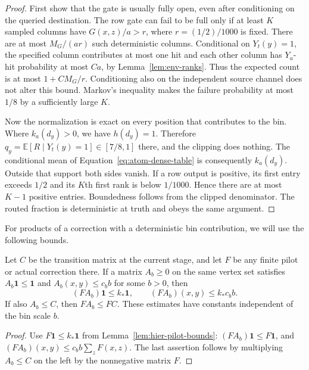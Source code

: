 \begin{proof}
First show that the gate is usually fully open, even after conditioning on the queried destination. The row gate can fail to be full only if at least $K$ sampled columns
have $G(x,z)/a>r$, where $r=(1/2)/1000$ is fixed.
There are at most $M_G/(ar)$ such deterministic columns.
Conditional on $Y_t(y)=1$, the specified column contributes at most one
hit and each other column has $Y_a$-hit probability at most $C a$, by
Lemma~\ref{lem:env-ranks}.  Thus the expected count is at most
$1+CM_G/r$.  Conditioning also on the independent source channel does
not alter this bound.  Markov's inequality makes the failure probability
at most $1/8$ by a sufficiently large $K$.

Now the normalization is exact on every position that contributes to the bin. Where $k_a(d_y)>0$, we have $h(d_y)=1$.  Therefore
$q_y=\mathbb E[R\mid Y_t(y)=1]\in[7/8,1]$ there, and the clipping
does nothing.  The conditional mean of Equation~\eqref{eq:atom-dense-table}
is consequently $k_a(d_y)$.  Outside that support both sides vanish.
If a row output is positive, its first entry exceeds $1/2$ and its
$K$th first rank is below $1/1000$.  Hence there are at most $K-1$
positive entries.  Boundedness follows from the clipped denominator.  The routed
fraction is deterministic at truth and obeys the same argument.
\end{proof}

For products of a correction with a deterministic bin contribution, we
will use the following bounds.

\begin{lemma}
\label{lem:hier-bin-products}
Let $C$ be the transition matrix at the current stage, and let $F$ be
any finite pilot or actual correction there.  If a matrix $A_b\geq0$
on the same vertex set satisfies $A_b\mathbf 1\leq\mathbf 1$ and
$A_b(x,y)\leq c_b b$ for some $b>0$, then
\[
 (FA_b)\mathbf 1\leq k_*\mathbf 1,
 \qquad (FA_b)(x,y)\leq k_*c_b b.
\]
If also $A_b\leq C$, then $FA_b\leq FC$.  These estimates have constants
independent of the bin scale $b$.
\end{lemma}

\begin{proof}
Use $F\mathbf 1\leq k_*\mathbf 1$ from
Lemma~\ref{lem:hier-pilot-bounds}:
$(FA_b)\mathbf 1\leq F\mathbf 1$, and
$(FA_b)(x,y)\leq c_b b\sum_zF(x,z)$.  The last assertion follows by
multiplying $A_b\leq C$ on the left by the nonnegative matrix $F$.
\end{proof}

